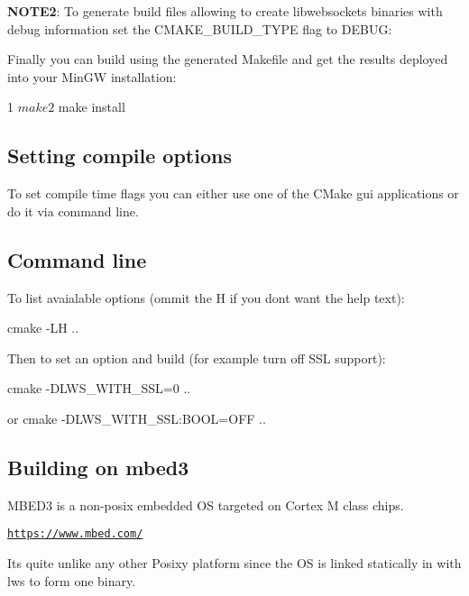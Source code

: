 \begin{DoxyEnumerate}
{\bfseries N\+O\+T\+E2}\+: To generate build files allowing to create libwebsockets binaries with debug information set the C\+M\+A\+K\+E\+\_\+\+B\+U\+I\+L\+D\+\_\+\+T\+Y\+PE flag to D\+E\+B\+UG\+: 

\item Finally you can build using the generated Makefile and get the results deployed into your Min\+GW installation\+:
\end{DoxyEnumerate}


\begin{DoxyCode}
1 $ make
2 $ make install
\end{DoxyCode}


\subsection*{Setting compile options }

To set compile time flags you can either use one of the C\+Make gui applications or do it via command line.

\subsection*{Command line }

To list avaialable options (ommit the H if you don\textquotesingle{}t want the help text)\+: \begin{DoxyVerb}    cmake -LH ..
\end{DoxyVerb}


Then to set an option and build (for example turn off S\+SL support)\+: \begin{DoxyVerb}    cmake -DLWS_WITH_SSL=0 ..
\end{DoxyVerb}
 or cmake -\/\+D\+L\+W\+S\+\_\+\+W\+I\+T\+H\+\_\+\+S\+SL\+:B\+O\+OL=O\+FF ..

\subsection*{Building on mbed3 }

M\+B\+E\+D3 is a non-\/posix embedded OS targeted on Cortex M class chips.

\href{https://www.mbed.com/}{\tt https\+://www.\+mbed.\+com/}

It\textquotesingle{}s quite unlike any other Posixy platform since the OS is linked statically in with lws to form one binary.

